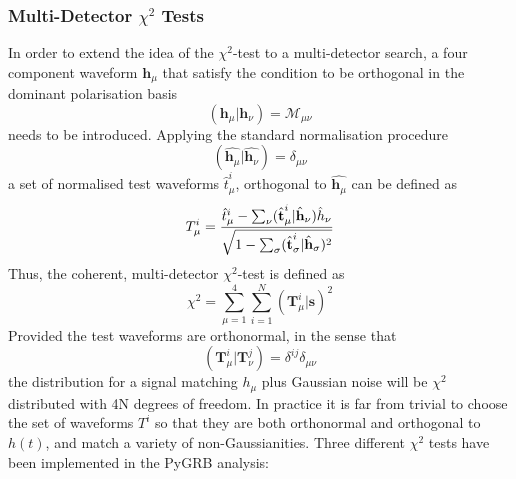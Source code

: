 \documentclass[binding=0.6cm, LaM]{sapthesis}
\begin{document}
\subsubsection{Multi-Detector $\chi^2$ Tests}
\label{subsubsec:multidec_chi_test}	
	In order to extend the idea of the $\chi^2$-test to a multi-detector search,
	a four component waveform $\textbf{h}_{\mu}$ that satisfy the condition to 	
	be orthogonal in the dominant polarisation basis 
        \begin{equation}
          (\textbf{h}_{\mu}|\textbf{h}_{\nu}) = \mathcal{M}_{\mu \nu}
        \end{equation}
	needs to be introduced.
	Applying the standard normalisation procedure
        \begin{equation}
          (\hat{\textbf{h}_{\mu}}|\hat{\textbf{h}_{\nu}}) = \delta_{\mu \nu}
        \end{equation}
	a set of normalised test waveforms $\hat{t}^i_{\mu}$, orthogonal to $\hat{\textbf{h}_{\mu}}$ can be defined as
        \begin{equation}
          T^i_{\mu} = {{\hat{t}^i_{\mu} - \sum_{\nu}(\hat{\textbf{t}}^i_{\mu}|\hat{\textbf{h}}_{\nu})\hat{h}_{\nu}} \over {\sqrt{1-\sum_{\sigma}(\hat{\textbf{t}}^i_{\sigma}|\hat{\textbf{h}}_{\sigma})^2}}}
        \end{equation}
	Thus, the coherent, multi-detector $\chi^2$-test is defined as 
        \begin{equation}
          \chi^2= \sum^4_{\mu=1} \sum^N_{i=1} (\textbf{T}^i_{\mu}|\textbf{s})^2
        \end{equation}
	Provided the test waveforms are orthonormal, in the 
        sense that 
        \begin{equation}
          (\textbf{T}^i_{\mu}| \textbf{T}^j_{\nu})= \delta^{ij} \delta_{\mu \nu}
        \end{equation}
	the distribution for a signal matching $h_{\mu}$ plus Gaussian noise will be $\chi^2$ distributed with 4N degrees of freedom. 
	In practice it is far from trivial to choose the set of waveforms $T^i$ so that 
	they are both orthonormal and orthogonal to $h(t)$, and match a variety of non-Gaussianities. 
	Three different $\chi^2$ tests have been implemented in the {\ttfamily PyGRB} analysis: 
\end{document}
